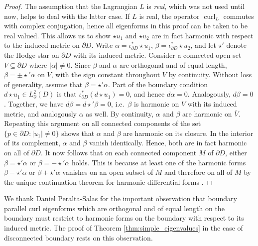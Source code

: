 \documentclass[11pt,reqno]{amsart}
\DeclareMathOperator{\curl}{curl}
\newcommand{\hodge}{\!\star\!}
\begin{document}
\begin{proof}
    The assumption that the Lagrangian $L$ is \emph{real}, which was not used until now, helps to deal with the latter case. If $L$ is real, the operator $\curl_L$ commutes with complex conjugation, hence all eigenforms in this proof can be taken to be real valued. This allows us to show $\star u_1$ and $\star u_2$ are in fact harmonic with respect to the induced metric on $\partial D$. Write $\alpha = \iota_{\partial D}^\ast \hodge u_1$, $\beta = \iota_{\partial D}^\ast \hodge u_2$, and let $\star'$ denote the Hodge-star on $\partial D$ with its induced metric. Consider a connected open set $V \subseteq \partial D$ where $|\alpha| \neq 0$. Since $\beta$ and $\alpha$ are orthogonal and of equal length, $\beta = \pm \star' \alpha$ on $V$, with the sign constant throughout $V$ by continuity. Without loss of generality, assume that $\beta = \star' \alpha$. Part of the boundary condition $d \star u_1 \in L^2_{\partial}(D)$ is that $\iota_{\partial D}^\ast(d \star u_1) = 0$, and hence $d\alpha = 0$. Analogously, $d\beta = 0$. Together, we have $d \beta = d \star' \! \beta = 0$, i.e.\ $\beta$ is harmonic on $V$ with its induced metric, and analogously $\alpha$ as well. By continuity, $\alpha$ and $\beta$ are harmonic on $\overline V$. Repeating this argument on all connected components of the set $\{p \in \partial D: |u_1| \neq 0\}$ shows that $\alpha$ and $\beta$ are harmonic on its closure. In the interior of its complement, $\alpha$ and $\beta$ vanish identically. Hence, both are in fact harmonic on all of $\partial D$. It now follows that on each connected component $M$ of $\partial D$, either $\beta = \star' \alpha$ or $\beta = -\star' \alpha$ holds. This is because at least one of the harmonic forms $\beta - \star'\alpha$ or $\beta + \star'\alpha$ vanishes on an open subset of $M$ and therefore on all of $M$ by the unique continuation theorem for harmonic differential forms \cite[Theorem 1]{Aronszajn1962}.
\end{proof}

We thank Daniel Peralta-Salas for the important observation that boundary parallel curl eigenforms which are orthogonal and of equal length on the boundary must restrict to harmonic forms on the boundary with respect to its induced metric. The proof of Theorem \ref{thm:simple_eigenvalues} in the case of disconnected boundary rests on this observation.
\end{document}
